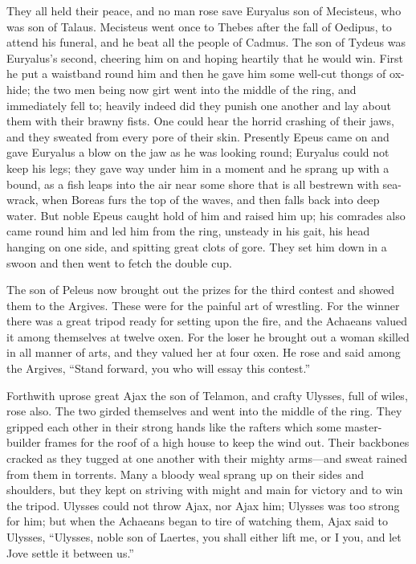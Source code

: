 They all held their peace, and no man rose save Euryalus son of Mecisteus,
who was son of Talaus. Mecisteus went once to Thebes after the fall of
Oedipus, to attend his funeral, and he beat all the people of Cadmus. The
son of Tydeus was Euryalus’s second, cheering him on and hoping heartily
that he would win. First he put a waistband round him and then he gave him
some well-cut thongs of ox-hide; the two men being now girt went into the
middle of the ring, and immediately fell to; heavily indeed did they
punish one another and lay about them with their brawny fists. One could
hear the horrid crashing of their jaws, and they sweated from every pore
of their skin. Presently Epeus came on and gave Euryalus a blow on the jaw
as he was looking round; Euryalus could not keep his legs; they gave way
under him in a moment and he sprang up with a bound, as a fish leaps into
the air near some shore that is all bestrewn with sea-wrack, when Boreas
furs the top of the waves, and then falls back into deep water. But noble
Epeus caught hold of him and raised him up; his comrades also came round
him and led him from the ring, unsteady in his gait, his head hanging on
one side, and spitting great clots of gore. They set him down in a swoon
and then went to fetch the double cup.

The son of Peleus now brought out the prizes for the third contest and
showed them to the Argives. These were for the painful art of wrestling.
For the winner there was a great tripod ready for setting upon the fire,
and the Achaeans valued it among themselves at twelve oxen. For the loser
he brought out a woman skilled in all manner of arts, and they valued her
at four oxen. He rose and said among the Argives, “Stand forward, you who
will essay this contest.”

Forthwith uprose great Ajax the son of Telamon, and crafty Ulysses, full
of wiles, rose also. The two girded themselves and went into the middle of
the ring. They gripped each other in their strong hands like the rafters
which some master-builder frames for the roof of a high house to keep the
wind out. Their backbones cracked as they tugged at one another with their
mighty arms—and sweat rained from them in torrents. Many a bloody
weal sprang up on their sides and shoulders, but they kept on striving
with might and main for victory and to win the tripod. Ulysses could not
throw Ajax, nor Ajax him; Ulysses was too strong for him; but when the
Achaeans began to tire of watching them, Ajax said to Ulysses, “Ulysses,
noble son of Laertes, you shall either lift me, or I you, and let Jove
settle it between us.”

